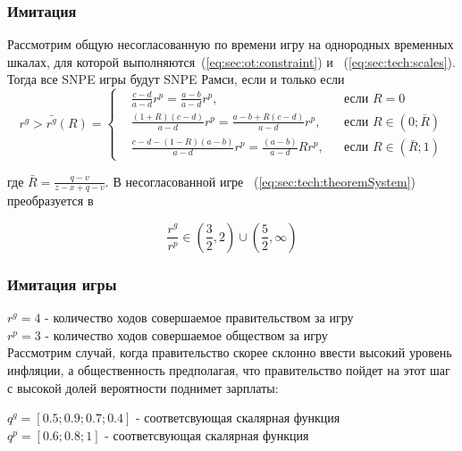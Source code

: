\documentclass {beamer}
\begin{document}
\begin{frame}
	\frametitle{Имитация}
	\begin{theorem}
	\small	Рассмотрим общую несогласованную по времени игру на однородных временных шкалах, для которой выполняются~(\ref{eq:sec:ot:constraint}) и ~(\ref{eq:sec:tech:scales}). Тогда все SNPE игры будут SNPE Рамси, если и только если
		{\scriptsize
		\begin{equation}
		\label{eq:sec:tech:theoremSystem}
		r^g> \bar{r^g}(R) = \left\{ 
		\begin{aligned} 
		&\frac{c - d}{a-d}r^p= \frac{a-b}{a-d}r^p, &&\text{если } R=0
		\\
		&\frac{(1+R)(c-d)}{a-d}r^p= \frac{a-b + R(c-d)}{a-d}r^p, &&\text{если } 	R\in(0; \bar{R})
		\\
		&\frac{c-d-(1-R)(a-b)}{a-d}r^p= \frac{(a-b)}{a-d}Rr^p, &&\text{если } 	R\in(\bar{R};1)
		\end{aligned}
		\right.		
		\end{equation}
	}

	где $\bar{R}=\frac{q-v}{z-x+q-v}$. В несогласованной игре   ~(\ref{eq:sec:tech:theoremSystem}) преобразуется в 
	
	\begin{equation}
	\frac{r^g}{r^p} \in \left(\frac{3}{2}, 2\right)\cup \left(\frac{5}{2}, \infty\right)
	\end{equation}
	\end{theorem}
\end{frame}

\begin{frame}
	\frametitle{Имитация игры}
	$r^g= 4 $ - количество ходов совершаемое  правительством за игру\\
	$r^p= 3 $ - количество ходов совершаемое  обществом за игру\\
	Рассмотрим случай, когда правительство скорее склонно ввести высокий уровень инфляции, а общественность предполагая, что правительство пойдет на этот шаг с высокой долей вероятности поднимет зарплаты:
	
	$q^g =[ 0.5; 0.9; 0.7; 0.4 ]$ - соответсвующая скалярная функция \\
	$q^p=[ 0.6; 0.8; 1] $ - соответсвующая скалярная функция \\
	
	
\end{frame}
\end{document}

